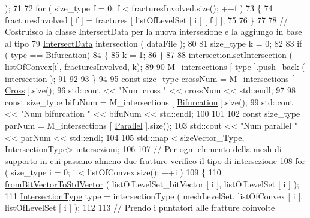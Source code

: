 \begin{DoxyCode}
       );
71 
72             \textcolor{keywordflow}{for} ( size\_type f = 0; f < fracturesInvolved.size(); ++f )
73             \{
74                  fracturesInvolved [ f ] = fractures [ listOfLevelSet [ i ] [ f ] ];
75 
76             \}
77 
78             \textcolor{comment}{// Costruisco la classe IntersectData per la nuova intersezione e la aggiungo in base al tipo}
79             \hyperlink{classIntersectData}{IntersectData} intersection ( dataFile );
80             
81             size\_type k = 0;
82             
83             \textcolor{keywordflow}{if} ( type == \hyperlink{classFractureIntersect_a9a4e4a784fa4c8e359767ed543f89dc5a4d466b3d3de0af7e18732b6f765bb1af}{Bifurcation})
84             \{
85                 k = 1;
86             \}
87             
88             intersection.setIntersection ( listOfConvex[i], fracturesInvolved, k);
89 
90             M\_intersections [ type ].push\_back ( intersection );
91 
92 
93         \}
94 
95         \textcolor{keyword}{const} size\_type crossNum = M\_intersections [ \hyperlink{classFractureIntersect_a9a4e4a784fa4c8e359767ed543f89dc5a743fef1af81c0e61412fafb9438b380e}{Cross} ].size();
96         std::cout << \textcolor{stringliteral}{"Num cross "} << crossNum << std::endl;
97 
98         \textcolor{keyword}{const} size\_type bifuNum = M\_intersections [ \hyperlink{classFractureIntersect_a9a4e4a784fa4c8e359767ed543f89dc5a4d466b3d3de0af7e18732b6f765bb1af}{Bifurcation} ].size();
99         std::cout << \textcolor{stringliteral}{"Num bifurcation "} << bifuNum << std::endl;
100 
101 
102         \textcolor{keyword}{const} size\_type parNum = M\_intersections [ \hyperlink{classFractureIntersect_a9a4e4a784fa4c8e359767ed543f89dc5ad91760e1506b52a828bc401490f7c92b}{Parallel} ].size();
103         std::cout << \textcolor{stringliteral}{"Num parallel "} << parNum << std::endl;
104 
105         std::map < sizeVector\_Type, IntersectionType> intersezioni;
106 
107         \textcolor{comment}{// Per ogni elemento della mesh di supporto in cui passano almeno due fratture verifico il tipo di
       intersezione}
108         \textcolor{keywordflow}{for} ( size\_type i = 0; i < listOfConvex.size(); ++i )
109         \{
110            \hyperlink{UsefulFunctions_8h_a0ea0b08a12a1e6a94718cf3bcd60edeb}{fromBitVectorToStdVector} ( listOfLevelSet\_bitVector [ i ], 
      listOfLevelSet [ i ] );
111            \hyperlink{classFractureIntersect_a9a4e4a784fa4c8e359767ed543f89dc5}{IntersectionType} type = intersectionType ( meshLevelSet, listOfConvex [ i ], 
      listOfLevelSet [ i ] );
112 
113            \textcolor{comment}{// Prendo i puntatori alle fratture coinvolte}

\end{DoxyCode}
